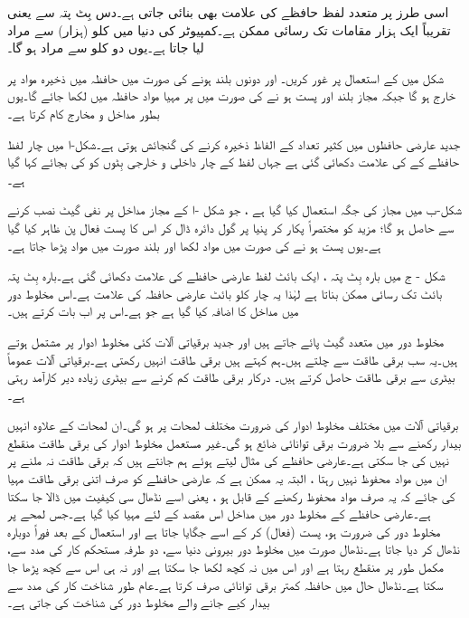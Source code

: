 اسی طرز پر متعدد لفظ  حافظے  کی علامت   بھی بنائی جاتی ہے۔دس بِٹ پتہ سے     یعنی  تقریباً ایک ہزار مقامات تک رسائی ممکن ہے۔کمپیوٹر کی دنیا  میں  کلو (ہزار) سے مراد     لیا جاتا ہے۔یوں دو  کلو سے مراد   ہو گا۔


شکل   میں    کے استعمال  پر غور کریں۔ اور     دونوں بلند ہونے کی صورت میں  حافظہ میں ذخیرہ مواد    پر خارج ہو گا جبکہ  مجاز بلند اور     پست ہو نے  کی صورت میں   پر  مہیا مواد حافظہ میں لکھا جائے گا۔یوں  بطور مداخل و مخارج   کام کرتا ہے۔

جدید عارضی حافظوں میں کثیر تعداد  کے الفاظ ذخیرہ کرنے کی گنجائش ہوتی ہے۔شکل-ا میں چار  لفظ  حافظے کے  کی علامت دکھائی گئی ہے  جہاں لفظ کے چار داخلی  و خارجی بِٹوں  کو  کی  بجائے  کہا گیا ہے۔

شکل-ب  میں مجاز کی جگہ  استعمال کیا گیا ہے ، جو شکل -ا کے مجاز مداخل پر نفی گیٹ نصب کرنے سے حاصل  ہو گا؛  مزید     کو مختصراً     پکار کر   پنیا پر گول دائرہ  ڈال کر اس کا  پست فعال  پن ظاہر کیا گیا ہے۔یوں  پست ہو نے کی صورت میں مواد لکھا اور بلند صورت میں     مواد پڑھا جاتا ہے۔

شکل - ج میں  بارہ بِٹ پتہ ،  ایک بائٹ   لفظ عارضی حافظے کی علامت دکھائی گئی ہے۔بارہ بِٹ پتہ   بائٹ تک رسائی ممکن بناتا  ہے لہٰذا  یہ چار کلو بائٹ عارضی حافظہ کی   علامت ہے۔اس مخلوط دور  میں   مداخل کا اضافہ کیا گیا ہے جو  ہے۔اس پر اب بات کرتے ہیں۔


 مخلوط دور میں متعدد  گیٹ پائے جاتے ہیں اور جدید  برقیاتی  آلات کئی مخلوط ادوار پر مشتمل ہوتے ہیں۔یہ سب  برقی طاقت سے چلتے ہیں۔ہم کہتے ہیں برقی طاقت انہیں  رکھتی  ہے۔برقیاتی  آلات عموماً  بیٹری سے برقی طاقت حاصل کرتے ہیں۔ درکار برقی طاقت کم  کرنے سے بیٹری زیادہ دیر کارآمد رہتی ہے۔
 
برقیاتی آلات میں مختلف مخلوط ادوار کی  ضرورت مختلف   لمحات  پر  ہو گی۔ان لمحات کے علاوہ انہیں بیدار رکھنے سے بلا ضرورت برقی توانائی   ضائع ہو گی۔غیر مستعمل  مخلوط ادوار کی برقی طاقت منقطع نہیں کی جا سکتی ہے۔عارضی حافظے کی مثال لیتے  ہوئے ہم  جانتے ہیں  کہ برقی طاقت نہ ملنے پر ان میں مواد محفوظ نہیں رہتا ، البتہ یہ  ممکن ہے کہ عارضی حافظے کو صرف اتنی برقی طاقت مہیا کی جائے کہ یہ صرف مواد محفوظ رکھنے کے قابل ہو ، یعنی اسے  نڈھال سی کیفیت میں ڈالا جا سکتا ہے۔عارضی حافظے  کے مخلوط دور میں   مداخل اس مقصد کے لئے مہیا کیا گیا ہے۔جس لمحے پر مخلوط دور کی ضرورت ہو،      پست (فعال)  کر کے اسے  جگایا جاتا ہے اور استعمال کے بعد فوراً دوبارہ نڈھال کر دیا جاتا ہے۔نڈھال صورت میں مخلوط دور بیرونی دنیا سے، دو طرفہ مستحکم کار کی مدد سے، مکمل طور  پر منقطع رہتا ہے اور اس میں نہ کچھ لکھا جا سکتا ہے اور نہ ہی اس سے کچھ پڑھا جا سکتا ہے۔نڈھال حال  میں حافظہ کمتر برقی توانائی صرف کرتا   ہے۔عام طور شناخت کار کی مدد سے   بیدار کیے جانے والے مخلوط دور کی  شناخت کی جاتی ہے۔

